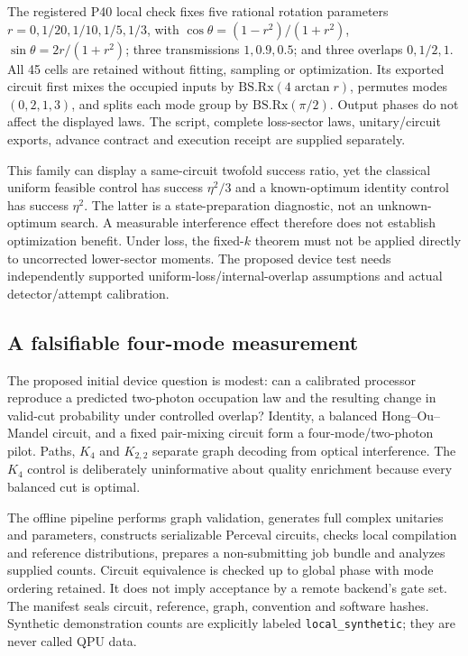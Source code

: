 The registered P40 local check fixes five rational rotation parameters $r=0,1/20,1/10,1/5,1/3$, with $\cos\theta=(1-r^2)/(1+r^2)$, $\sin\theta=2r/(1+r^2)$; three transmissions $1,0.9,0.5$; and three overlaps $0,1/2,1$. All 45 cells are retained without fitting, sampling or optimization. Its exported circuit first mixes the occupied inputs by $\mathrm{BS.Rx}(4\arctan r)$, permutes modes $(0,2,1,3)$, and splits each mode group by $\mathrm{BS.Rx}(\pi/2)$. Output phases do not affect the displayed laws. The script, complete loss-sector laws, unitary/circuit exports, advance contract and execution receipt are supplied separately.

This family can display a same-circuit twofold success ratio, yet the classical uniform feasible control has success $\eta^2/3$ and a known-optimum identity control has success $\eta^2$. The latter is a state-preparation diagnostic, not an unknown-optimum search. A measurable interference effect therefore does not establish optimization benefit. Under loss, the fixed-$k$ theorem must not be applied directly to uncorrected lower-sector moments. The proposed device test needs independently supported uniform-loss/internal-overlap assumptions and actual detector/attempt calibration.

\subsection{A falsifiable four-mode measurement}
The proposed initial device question is modest: can a calibrated processor reproduce a predicted two-photon occupation law and the resulting change in valid-cut probability under controlled overlap? Identity, a balanced Hong--Ou--Mandel circuit, and a fixed pair-mixing circuit form a four-mode/two-photon pilot. Paths, $K_4$ and $K_{2,2}$ separate graph decoding from optical interference. The $K_4$ control is deliberately uninformative about quality enrichment because every balanced cut is optimal.

The offline pipeline performs graph validation, generates full complex unitaries and parameters, constructs serializable Perceval circuits, checks local compilation and reference distributions, prepares a non-submitting job bundle and analyzes supplied counts. Circuit equivalence is checked up to global phase with mode ordering retained. It does not imply acceptance by a remote backend's gate set. The manifest seals circuit, reference, graph, convention and software hashes. Synthetic demonstration counts are explicitly labeled \texttt{local\_synthetic}; they are never called QPU data.

